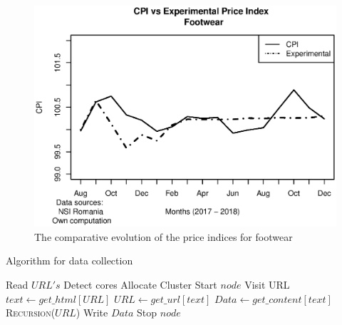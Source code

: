 \documentclass[]{article}
\begin{document}
\begin{figure}
	\centering
	\includegraphics[width=1\linewidth]{fig5.eps}
	\caption{The comparative evolution of the price indices for footwear}
	\label{fig:6}
\end{figure}

\clearpage


\begin{algorithm}[h]
	\caption{Algorithm for data collection}
	\label{alg:dc}
	\begin{algorithmic}
		\State Read $URL's$
		\State Detect cores
		\State Allocate Cluster
		\State Start $node$
		\State\Return
		\Else
		\State Visit URL
		\State $text \gets get\_html[URL]$
		\State $URL  \gets get\_url[text]$
		\State $Data \gets get\_content[text]$
		\State \Return \textsc{Recursion}{($URL$)}
		\EndIf
		\State Write $Data$
		\EndProcedure
		\State Stop $node$
		\EndFor	
	\end{algorithmic}
\end{algorithm}

\end{document}
